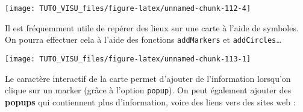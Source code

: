 \documentclass[]{book}
\newenvironment{Shaded}{\begin{snugshade}}{\end{snugshade}}
\newcommand{\DataTypeTok}[1]{\textcolor[rgb]{0.13,0.29,0.53}{#1}}
\newcommand{\DecValTok}[1]{\textcolor[rgb]{0.00,0.00,0.81}{#1}}
\newcommand{\ErrorTok}[1]{\textcolor[rgb]{0.64,0.00,0.00}{\textbf{#1}}}
\newcommand{\FloatTok}[1]{\textcolor[rgb]{0.00,0.00,0.81}{#1}}
\newcommand{\KeywordTok}[1]{\textcolor[rgb]{0.13,0.29,0.53}{\textbf{#1}}}
\newcommand{\NormalTok}[1]{#1}
\newcommand{\OperatorTok}[1]{\textcolor[rgb]{0.81,0.36,0.00}{\textbf{#1}}}
\newcommand{\OtherTok}[1]{\textcolor[rgb]{0.56,0.35,0.01}{#1}}
\newcommand{\StringTok}[1]{\textcolor[rgb]{0.31,0.60,0.02}{#1}}
\theoremstyle{definition}
\theoremstyle{definition}
\theoremstyle{definition}
\theoremstyle{remark}
\begin{document}
\begin{center}\texttt{[image: TUTO\_VISU\_files/figure-latex/unnamed-chunk-112-4]} \end{center}

Il est fréquemment utile de repérer des lieux sur une carte à l'aide de symboles. On pourra effectuer cela à l'aide des fonctions \texttt{addMarkers} et \texttt{addCircles}\ldots{}

\begin{Shaded}
\end{Shaded}

\begin{center}\texttt{[image: TUTO\_VISU\_files/figure-latex/unnamed-chunk-113-1]} \end{center}

Le caractère interactif de la carte permet d'ajouter de l'information lorsqu'on clique sur un marker (grâce à l'option \texttt{popup}). On peut également ajouter des \textbf{popups} qui contiennent plus d'information, voire des liens vers des sites web :

\begin{Shaded}
\end{Shaded}
\end{document}
